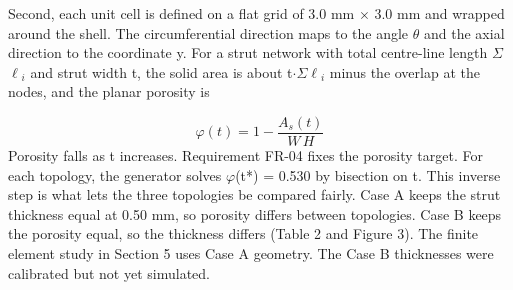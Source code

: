 \documentclass[10pt,twocolumn,letterpaper]{article}
\begin{document}
Second, each unit cell is defined on a flat grid of 3.0 mm $\times$ 3.0 mm and wrapped around the shell. The circumferential direction maps to the angle $\theta$ and the axial direction to the coordinate y. For a strut network with total centre-line length $\Sigma$$\ell$$_{i}$ and strut width t, the solid area is about t$\cdot$$\Sigma$$\ell$$_{i}$ minus the overlap at the nodes, and the planar porosity is

\begin{equation}\varphi(t) = 1 - \frac{A_s(t)}{W\,H}\end{equation}
Porosity falls as t increases. Requirement FR-04 fixes the porosity target. For each topology, the generator solves $\varphi$(t*) = 0.530 by bisection on t. This inverse step is what lets the three topologies be compared fairly. Case A keeps the strut thickness equal at 0.50 mm, so porosity differs between topologies. Case B keeps the porosity equal, so the thickness differs (Table 2 and Figure 3). The finite element study in Section 5 uses Case A geometry. The Case B thicknesses were calibrated but not yet simulated.
\end{document}
